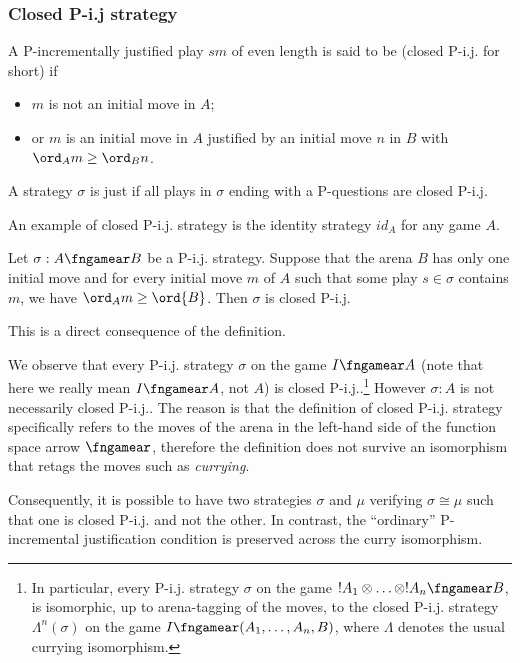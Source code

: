 \subsubsection{Closed P-i.j strategy}

\begin{definition}
\label{def:closedpij} A P-incrementally justified play $s m$ of even
length is said to be 
(closed P-i.j. for short) if
\begin{itemize}
\item $m$ is not an initial move in $A$;
\item or $m$ is an initial move in $A$ justified by an initial move $n$ in
$B$ with $\ord_A m \geq \ord_B n$.
\end{itemize}

A strategy $\sigma$ is  just if all plays in
$\sigma$ ending with a P-questions are closed P-i.j.
\end{definition}

An example of closed P-i.j. strategy is the identity strategy $id_A$
for any game $A$.

\begin{lemma}
\label{lem:closedpij_singleBinitmove} Let $\sigma : A \fngamear B$
be a P-i.j. strategy. Suppose that the arena $B$ has only one
initial move and for every initial move $m$ of $A$ such that some
play $s\in\sigma$ contains $m$, we have $\ord_A{m} \geq \ord{B}$.
Then $\sigma$ is closed P-i.j.
\end{lemma}
This is a direct consequence of the definition.


We observe that every P-i.j. strategy $\sigma$ on the game $I
\fngamear A$ (note that here we really mean $I \fngamear A$, not
$A$) is closed P-i.j..\footnote{In particular, every P-i.j. strategy
$\sigma$ on the game $!A_1 \otimes \ldots \otimes !A_n \fngamear B$,
is isomorphic, up to arena-tagging of the moves, to the closed
P-i.j. strategy $\Lambda^n(\sigma)$ on the game $I \fngamear
(A_1,\ldots,A_n,B)$, where $\Lambda$ denotes the usual currying
isomorphism.} However $\sigma : A$ is not necessarily closed P-i.j..
The reason is that the definition of closed P-i.j. strategy
specifically refers to the moves of  the arena in the left-hand side
of the function space arrow $\fngamear$, therefore the definition
does not survive an isomorphism that retags the moves such as {\it
currying}.

Consequently, it is possible to have two strategies $\sigma$ and
$\mu$ verifying $\sigma \cong \mu$ such that one is closed P-i.j.
and not the other. In contrast, the ``ordinary'' P-incremental
justification condition is preserved across the curry isomorphism.

